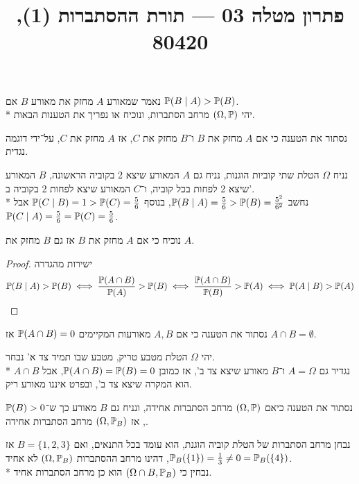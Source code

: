 
\title{פתרון מטלה 03 --- תורת ההסתברות (1), 80420}


\maketitle
\maketitleprint{}

\Question{}
נאמר שמאורע $A$ מחזק את מאורע $B$ אם $\mathbb{P}(B \mid A) > \mathbb{P}(B)$. \\*
יהי $(\Omega, \mathbb{P})$ מרחב הסתברות, ונוכיח או נפריך את הטענות הבאות.

\Subquestion{}
נסתור את הטענה כי אם $A$ מחזק את $B$ ו־$B$ מחזק את $C$, אז $A$ מחזק את $C$, על־ידי דוגמה נגדית.
\begin{solution}
	נניח $\Omega$ הטלת שתי קוביות הוגנות, נניח גם $A$ המאורע שיצא 2 בקוביה הראשונה, $B$ המאורע שיצא 2 לפחות בכל קוביה, ו־$C$ המאורע שיצא לפחות 2 בקוביה ב'. \\*
	נחשב $\mathbb{P}(B \mid A) = \frac{5}{6} > \mathbb{P}(B) = \frac{5^2}{6^2}$, בנוסף $\mathbb{P}(C \mid B) = 1 > \mathbb{P}(C) = \frac{5}{6}$ אבל $\mathbb{P}(C \mid A) = \frac{5}{6} = \mathbb{P}(C) = \frac{5}{6}$.
\end{solution}

\Subquestion{}
נוכיח כי אם $A$ מחזק את $B$ אז גם $B$ מחזק את $A$.
\begin{proof}
	ישירות מהגדרה
	\[
		\mathbb{P}(B \mid A) > \mathbb{P}(B)
		\iff \frac{\mathbb{P}(A \cap B)}{\mathbb{P}(A)} > \mathbb{P}(B)
		\iff \frac{\mathbb{P}(A \cap B)}{\mathbb{P}(B)} > \mathbb{P}(A)
		\iff \mathbb{P}(A \mid B) > \mathbb{P}(A)
	\]
\end{proof}

\Subquestion{}
נסתור את הטענה כי אם $A, B$ מאורעות המקיימים $\mathbb{P}(A \cap B) = 0$ אז $A \cap B = \emptyset$.
\begin{solution}
	יהי $\Omega$ הטלת מטבע טריק, מטבע שבו תמיד צד א' נבחר. \\*
	נגדיר גם $A = \Omega$ ו־$B$ מאורע שיצא צד ב', אז כמובן $\mathbb{P}(A \cap B) = \mathbb{P}(B) = 0$, אבל $A \cap B$ הוא המקרה שיצא צד ב', ובפרט איננו מאורע ריק.
\end{solution}

\Subquestion{}
נסתור את הטענה כיאם $(\Omega, \mathbb{P})$ מרחב הסתברות אחידה, ונניח גם $B$ מאורע כך ש־$\mathbb{P}(B) > 0$, אז $(\Omega, \mathbb{P}_B)$ מרחב הסתברות אחידה.
\begin{solution}
	נבחן מרחב הסתברות של הטלת קוביה הוגנת, הוא עומד בכל התנאים, ואם $B = \{ 1, 2, 3 \}$ אז $\mathbb{P}_B(\{1\}) = \frac{1}{3} \ne 0 = \mathbb{P}_B(\{4\})$, דהינו מרחב ההסתברות $(\Omega, \mathbb{P}_B)$ לא אחיד. \\*
	נבחין כי $(\Omega \cap B, \mathbb{P}_B)$ הוא כן מרחב הסתברות אחיד.
\end{solution}

